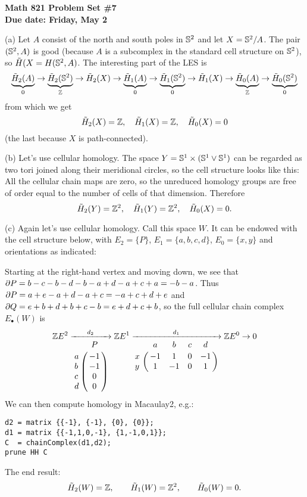 
\usepackage{youngtab}

\thispagestyle{empty}
{\bf Math 821 Problem Set \#7\\
Due date: Friday, May 2}
\bigskip



\soln (a) Let $A$ consist of the north and south poles in $\mathbb{S}^2$ and let $X=\mathbb{S}^2/A$.  The pair $(\mathbb{S}^2,A)$ is good (because $A$ is a subcomplex in the standard cell structure on $\mathbb{S}^2$), so $\tilde H(X=H(\mathbb{S}^2,A)$.  The interesting part of the LES is
\[\underbrace{\tilde H_2(A)}_0\to\underbrace{\tilde H_2(\mathbb{S}^2)}_{\mathbb{Z}}\to\tilde H_2(X)\to\underbrace{\tilde H_1(A)}_0\to\underbrace{\tilde H_1(\mathbb{S}^2)}_0\to\tilde H_1(X)\to\underbrace{\tilde H_0(A)}_{\mathbb{Z}}\to\underbrace{\tilde H_0(\mathbb{S}^2)}_0\]
from which we get
\[\tilde H_2(X)=\mathbb{Z}, \quad \tilde H_1(X)=\mathbb{Z},\quad \tilde H_0(X)=0\]
(the last because $X$ is path-connected).

(b) Let's use cellular homology.  The space $Y=\mathbb{S}^1\times(\mathbb{S}^1\vee\mathbb{S}^1)$ can be regarded as two tori joined along their meridional circles, so the cell structure looks like this:
All the cellular chain maps are zero, so the unreduced homology groups are free of order equal to the number of cells of that dimension.  Therefore
\[\tilde H_2(Y)=\mathbb{Z}^2, \quad \tilde H_1(Y)=\mathbb{Z}^2,\quad \tilde H_0(X)=0.\]

(c) Again let's use cellular homology.  Call this space $W$.  It can be endowed with the cell structure below, with $E_2=\{P\}$, $E_1=\{a,b,c,d\}$, $E_0=\{x,y\}$ and orientations as indicated:


Starting at the right-hand vertex and moving down, we see that $\partial P=b-c-b-d-b-a+d-a+c+a=-b-a$.
Thus $\partial P = a+e-a+d-a+c=-a+c+d+e$ and $\partial Q=e+b+d+b+c-b=e+d+c+b$, so the full cellular chain complex $E_\bullet(W)$ is
\[
\Zz E^2\xrightarrow[\bordermatrix{&P\cr a&-1\cr b&-1\cr c&0\cr d&0}]{d_2}
\Zz E^1\xrightarrow[\bordermatrix{&a&b&c&d\cr x&-1&1&0&-1\cr y&1&-1&0&1}]{d_1}
\Zz E^0 \to 0
\]
We can then compute homology in Macaulay2, e.g.:
\begin{verbatim}
d2 = matrix {{-1}, {-1}, {0}, {0}};
d1 = matrix {{-1,1,0,-1}, {1,-1,0,1}};
C  = chainComplex(d1,d2);
prune HH C
\end{verbatim}
The end result:
\[\tilde H_2(W)=\mathbb{Z}, \qquad \tilde H_1(W)=\mathbb{Z}^2, \qquad \tilde H_0(W)=0.\]

